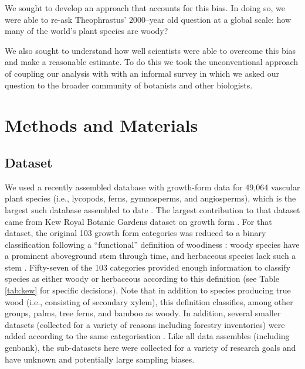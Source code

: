 \documentclass[a4paper,12pt]{article}
\begin{document}
We sought to develop an approach that accounts for this bias.  In doing so, we 
were able to re-ask Theophrastus' 2000--year old
question at a global scale: how many of the world's plant species are
woody?

We also sought to understand how well scientists were able to overcome this bias and make a reasonable estimate.  To do this 
we took the unconventional approach of coupling our
analysis with with an informal survey in which we asked our question
to the broader community of botanists and other biologists.
% 
%

\section{Methods and Materials}

\subsection{Dataset}

We used a recently assembled database with growth-form data for 49,064
vascular plant species (i.e., lycopods, ferns,
gymnosperms, and angiosperms), which is the largest such database assembled
to date \citep{Zanne}. The largest contribution to that  dataset came
from Kew Royal Botanic Gardens dataset on growth form \citep{Kew}.  
For that dataset, the original 103 growth form categories was reduced to a binary
classification following a ``functional'' definition of woodiness : 
woody species have a prominent aboveground stem through time, and herbaceous species lack such a stem
\citep[see an early use of this definition by Asa Gray:][]{gray1887elements}.  
Fifty-seven of the 103 categories provided enough information to classify species
as either woody or herbaceous according to this definition (see Table
\ref{tab:kew} for specific decisions).  Note that in addition to species producing true wood
(i.e., consisting of secondary xylem), this definition classifies,
among other groups, palms, tree ferns, and bamboo as woody.  
In addition, several smaller
datasets (collected for a variety of reasons including forestry inventories) were added 
according to the same categorisation
\citep{Zanne}.  
Like all data assembles (including genbank), the sub-datasets here were collected for a variety of research goals 
and have unknown and potentially large sampling biases.  
\end{document}
